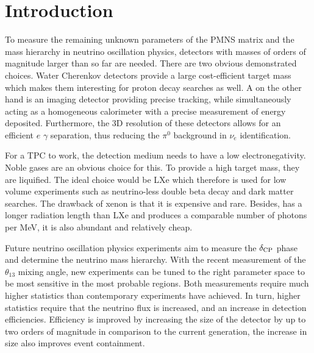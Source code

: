 \chapter{Introduction}
\label{chap:introduction}

To measure the remaining unknown parameters of the PMNS matrix and the mass hierarchy in neutrino oscillation physics, detectors with masses of orders of magnitude larger than so far are needed.
There are two obvious demonstrated choices.
Water Cherenkov detectors provide a large cost-efficient target mass which makes them interesting for proton decay searches as well.
A \lartpc{} on the other hand is an imaging detector providing precise tracking, while simultaneously acting as a homogeneous calorimeter with a precise measurement of energy deposited.
Furthermore, the 3D resolution of these detectors allows for an efficient $e$ $\gamma$ separation, thus reducing the $\pi^0$ background in $\nu_e$ identification.

For a TPC to work, the detection medium needs to have a low electronegativity.
Noble gases are an obvious choice for this.
To provide a high target mass, they are liquified.
The ideal choice would be LXe which therefore is used for low volume experiments such as neutrino-less double beta decay and dark matter searches.
The drawback of xenon is that it is expensive and rare.
Besides, \lar{} has a longer radiation length than LXe and produces a comparable number of photons per \si{\mega\electronvolt}, it is also abundant and relatively cheap.

Future neutrino oscillation physics experiments aim to measure the $\delta_{\mathrm{CP}}$ phase and determine the neutrino mass hierarchy.
With the recent measurement of the $\theta_{13}$ mixing angle, new experiments can be tuned to the right parameter space to be most sensitive in the most probable regions.
Both measurements require much higher statistics than contemporary experiments have achieved.
In turn, higher statistics require that the neutrino flux is increased, and an increase in detection efficiencies.
Efficiency is improved by increasing the size of the detector by up to two orders of magnitude in comparison to the current generation, the increase in size also improves event containment.

